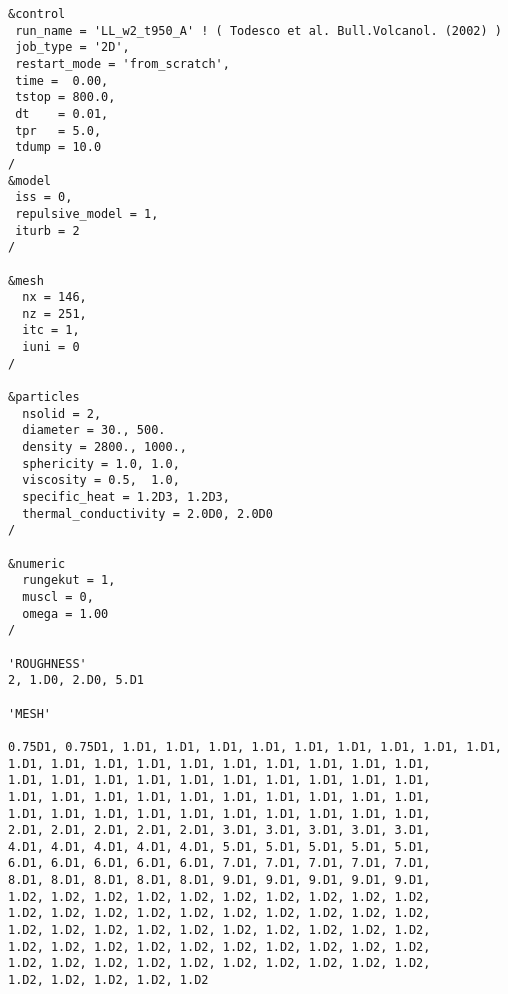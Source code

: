 \begin{verbatim}
&control
 run_name = 'LL_w2_t950_A' ! ( Todesco et al. Bull.Volcanol. (2002) )
 job_type = '2D',
 restart_mode = 'from_scratch',
 time =  0.00,
 tstop = 800.0,
 dt    = 0.01,
 tpr   = 5.0,
 tdump = 10.0
/
&model
 iss = 0,
 repulsive_model = 1,
 iturb = 2
/

&mesh
  nx = 146,
  nz = 251,
  itc = 1,
  iuni = 0
/

&particles
  nsolid = 2, 
  diameter = 30., 500.
  density = 2800., 1000.,
  sphericity = 1.0, 1.0,
  viscosity = 0.5,  1.0,
  specific_heat = 1.2D3, 1.2D3, 
  thermal_conductivity = 2.0D0, 2.0D0
/

&numeric
  rungekut = 1,
  muscl = 0,
  omega = 1.00
/

'ROUGHNESS'
2, 1.D0, 2.D0, 5.D1

'MESH'

0.75D1, 0.75D1, 1.D1, 1.D1, 1.D1, 1.D1, 1.D1, 1.D1, 1.D1, 1.D1, 1.D1,
1.D1, 1.D1, 1.D1, 1.D1, 1.D1, 1.D1, 1.D1, 1.D1, 1.D1, 1.D1,
1.D1, 1.D1, 1.D1, 1.D1, 1.D1, 1.D1, 1.D1, 1.D1, 1.D1, 1.D1,
1.D1, 1.D1, 1.D1, 1.D1, 1.D1, 1.D1, 1.D1, 1.D1, 1.D1, 1.D1,
1.D1, 1.D1, 1.D1, 1.D1, 1.D1, 1.D1, 1.D1, 1.D1, 1.D1, 1.D1,
2.D1, 2.D1, 2.D1, 2.D1, 2.D1, 3.D1, 3.D1, 3.D1, 3.D1, 3.D1,
4.D1, 4.D1, 4.D1, 4.D1, 4.D1, 5.D1, 5.D1, 5.D1, 5.D1, 5.D1,
6.D1, 6.D1, 6.D1, 6.D1, 6.D1, 7.D1, 7.D1, 7.D1, 7.D1, 7.D1,
8.D1, 8.D1, 8.D1, 8.D1, 8.D1, 9.D1, 9.D1, 9.D1, 9.D1, 9.D1,
1.D2, 1.D2, 1.D2, 1.D2, 1.D2, 1.D2, 1.D2, 1.D2, 1.D2, 1.D2,
1.D2, 1.D2, 1.D2, 1.D2, 1.D2, 1.D2, 1.D2, 1.D2, 1.D2, 1.D2,
1.D2, 1.D2, 1.D2, 1.D2, 1.D2, 1.D2, 1.D2, 1.D2, 1.D2, 1.D2,
1.D2, 1.D2, 1.D2, 1.D2, 1.D2, 1.D2, 1.D2, 1.D2, 1.D2, 1.D2,
1.D2, 1.D2, 1.D2, 1.D2, 1.D2, 1.D2, 1.D2, 1.D2, 1.D2, 1.D2,
1.D2, 1.D2, 1.D2, 1.D2, 1.D2


\end{verbatim}
